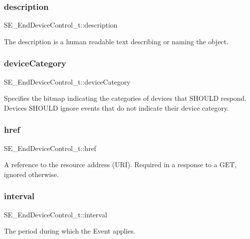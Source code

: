\subsubsection{\texorpdfstring{description}{description}}
{\footnotesize\ttfamily S\+E\+\_\+\+End\+Device\+Control\+\_\+t\+::description}

The description is a human readable text describing or naming the object. \mbox{\label{group__EndDeviceControl_ga1ecabe8c562fa33ae1294d90bc5a5bd2}} 
\subsubsection{\texorpdfstring{device\+Category}{deviceCategory}}
{\footnotesize\ttfamily S\+E\+\_\+\+End\+Device\+Control\+\_\+t\+::device\+Category}

Specifies the bitmap indicating the categories of devices that S\+H\+O\+U\+LD respond. Devices S\+H\+O\+U\+LD ignore events that do not indicate their device category. \mbox{\label{group__EndDeviceControl_gaae75efbe6c13cc0e8e0217103f629b44}} 
\subsubsection{\texorpdfstring{href}{href}}
{\footnotesize\ttfamily S\+E\+\_\+\+End\+Device\+Control\+\_\+t\+::href}

A reference to the resource address (U\+RI). Required in a response to a G\+ET, ignored otherwise. \mbox{\label{group__EndDeviceControl_ga6b0199442cfc19ab1caaf0005b9d1900}} 
\subsubsection{\texorpdfstring{interval}{interval}}
{\footnotesize\ttfamily S\+E\+\_\+\+End\+Device\+Control\+\_\+t\+::interval}

The period during which the Event applies. \mbox{\label{group__EndDeviceControl_ga2d9078ee1ddd1569a54b6522d3d92777}} 
